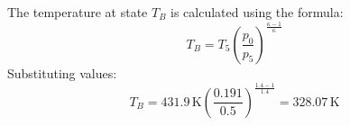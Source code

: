The temperature at state \( T_B \) is calculated using the formula:  
\[
T_B = T_5 \left( \frac{p_0}{p_5} \right)^{\frac{\kappa - 1}{\kappa}}
\]  
Substituting values:  
\[
T_B = 431.9 \, \text{K} \left( \frac{0.191}{0.5} \right)^{\frac{1.4 - 1}{1.4}} = 328.07 \, \text{K}
\]